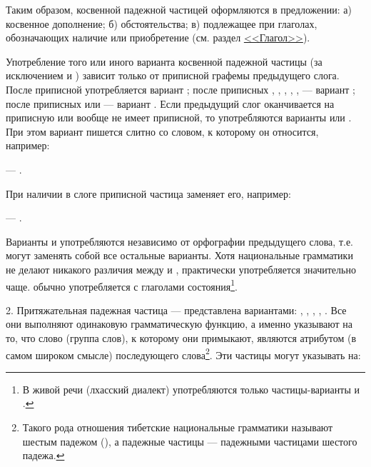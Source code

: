 Таким образом, косвенной падежной частицей оформляются в предложении: а) косвенное дополнение; б) обстоятельства; в) подлежащее при глаголах, обозначающих наличие или приобретение (см. раздел \hyperref[sec:glagol]{<<Глагол>>}).

Употребление того или иного варианта косвенной падежной частицы (за исключением  и ) зависит только от приписной графемы предыдущего слога. После приписной  употребляется вариант ; после приписных , , , , ,  --- вариант  ; после приписных  или  --- вариант . Если предыдущий слог оканчивается на приписную  или вообще не имеет приписной, то употребляются варианты  или . При этом вариант  пишется слитно со словом, к которому он относится, например:
\begin{prfsample}
	\item {} --- .	
\end{prfsample}
При наличии в слоге приписной  частица  заменяет его, например:
\begin{prfsample}
	\item {} --- .
\end{prfsample}

Варианты  и  употребляются независимо от орфографии предыдущего слова, т.е. могут заменять собой все остальные варианты. Хотя национальные грамматики не делают никакого различия между  и , практически  употребляется значительно чаще.  обычно употребляется с глаголами состояния\footnote[45]{В живой речи (лхасский диалект) употребляются только частицы-варианты  и .}.

\label{04_06_ppch}2. Притяжательная падежная частица --- представлена вариантами: , , , , . Все они выполняют одинаковую грамматическую функцию, а именно указывают на то, что слово (группа слов), к которому они примыкают, являются атрибутом (в самом широком смысле) последующего слова\footnote[46]{Такого рода отношения тибетские национальные грамматики называют шестым падежом (), а падежные частицы --- падежными частицами шестого падежа.}.
Эти частицы могут указывать на:

